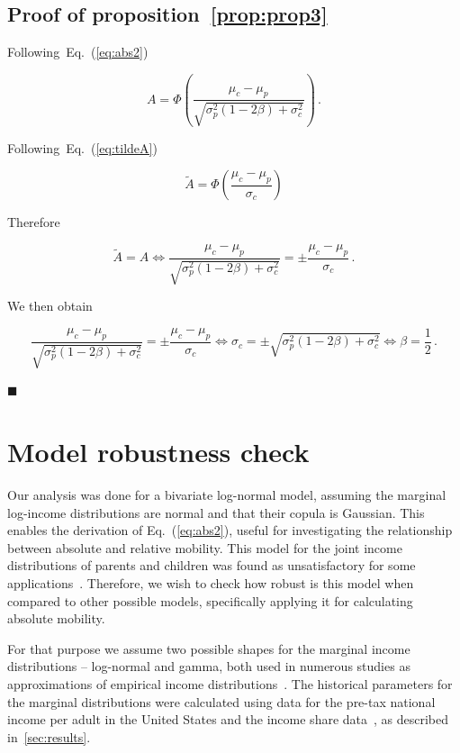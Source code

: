 \documentclass[12pt,a4paper]{article}
\newcommand*{\qed}{\hfill\ensuremath{\blacksquare}}%
\newcommand{\eref}[1]{Eq.~(\ref{eq:#1})}
\newcommand{\preflong}[1]{proposition~\ref{prop:#1}}
\newcommand{\be}{\begin{equation}}
\newcommand{\ee}{\end{equation}}
\numberwithin{equation}{section}
\begin{document}
\subsection{Proof of \preflong{prop3}}

Following~\eref{abs2}

\be
A = \Phi\left(\frac{\mu_c - \mu_p}{\sqrt{\sigma_p^2\left(1 - 2\beta\right) + \sigma_c^2}}\right) \,.
\ee

Following~\eref{tildeA}

\be
\tilde{A} = \Phi\left(\frac{\mu_c-\mu_p}{\sigma_c} \right)
\ee

Therefore

\be
\tilde{A}=A \iff \frac{\mu_c - \mu_p}{\sqrt{\sigma_p^2\left(1 - 2\beta\right) + \sigma_c^2}} = \pm\frac{\mu_c-\mu_p}{\sigma_c}\,.
\ee

We then obtain

\be
\frac{\mu_c - \mu_p}{\sqrt{\sigma_p^2\left(1 - 2\beta\right) + \sigma_c^2}} = \pm\frac{\mu_c-\mu_p}{\sigma_c} \iff \sigma_c = \pm\sqrt{\sigma_p^2\left(1 - 2\beta\right) + \sigma_c^2} \iff \beta = \frac{1}{2}\,.
\ee

\qed

\section{Model robustness check}
\label{app:appB}

Our analysis was done for a bivariate log-normal model, assuming the marginal log-income distributions are normal and that their copula is Gaussian. This enables the derivation of \eref{abs2}, useful for investigating the relationship between absolute and relative mobility. This model for the joint income distributions of parents and children was found as unsatisfactory for some applications~\citep{bonhomme2009assessing}. Therefore, we wish to check how robust is this model when compared to other possible models, specifically applying it for calculating absolute mobility.

For that purpose we assume two possible shapes for the marginal income distributions -- log-normal and gamma, both used in numerous studies as approximations of empirical income distributions~\citep{salem1974convenient,pinkovskiy2009parametric}. The historical parameters for the marginal distributions were calculated using data for the pre-tax national income per adult in the United States and the income share data~\citep{WID2017}, as described in~\ref{sec:results}.
\end{document}
